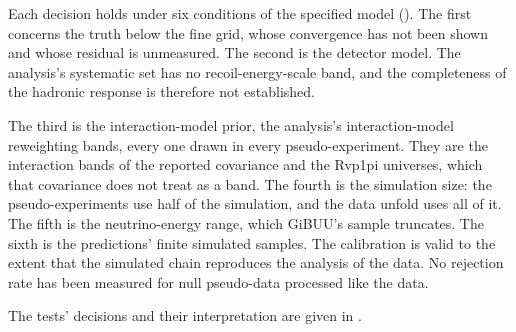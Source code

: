 Each decision holds under six conditions of the specified model (). The first concerns the truth below the fine grid, whose convergence has not been shown and whose residual is unmeasured. The second is the detector model. The analysis's systematic set has no recoil-energy-scale band, and the completeness of the hadronic response is therefore not established.

The third is the interaction-model prior, the analysis's \jtModelBands{} interaction-model reweighting bands, every one drawn in every pseudo-experiment. They are the  interaction bands of the reported covariance and the Rvp1pi universes, which that covariance does not treat as a band. The fourth is the simulation size: the pseudo-experiments use half of the simulation, and the data unfold uses all of it. The fifth is the neutrino-energy range, which GiBUU's sample truncates. The sixth is the predictions' finite simulated samples. The calibration is valid to the extent that the simulated chain reproduces the analysis of the data. No rejection rate has been measured for null pseudo-data processed like the data.

The tests' decisions and their interpretation are given in .


